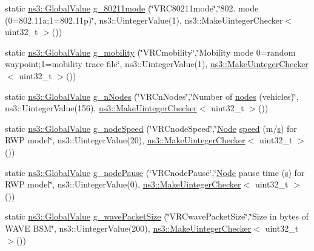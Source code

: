 \begin{DoxyCompactItemize}
\item 
static \hyperlink{classns3_1_1GlobalValue}{ns3\+::\+Global\+Value} \hyperlink{vanet-routing-compare_8cc_ac1a83af8a2f108bc9199027f9a12bde1}{g\+\_\+80211mode} (\char`\"{}V\+R\+C80211mode\char`\"{},\char`\"{}802. mode (0=802.\+11a;1=802.\+11p)\char`\"{}, ns3\+::\+Uinteger\+Value(1), ns3\+::\+Make\+Uinteger\+Checker$<$ uint32\+\_\+t $>$())
\item 
static \hyperlink{classns3_1_1GlobalValue}{ns3\+::\+Global\+Value} \hyperlink{vanet-routing-compare_8cc_a21858fbf533039d45630ff460f711898}{g\+\_\+mobility} (\char`\"{}V\+R\+Cmobility\char`\"{},\char`\"{}Mobility mode 0=random waypoint;1=mobility trace file\char`\"{}, ns3\+::\+Uinteger\+Value(1), \hyperlink{namespacens3_aed274764da411ed9397a3524a7c9abb8}{ns3\+::\+Make\+Uinteger\+Checker}$<$ uint32\+\_\+t $>$())
\item 
static \hyperlink{classns3_1_1GlobalValue}{ns3\+::\+Global\+Value} \hyperlink{vanet-routing-compare_8cc_a7432e7fa342e3ef6bb5db75753b31a3c}{g\+\_\+n\+Nodes} (\char`\"{}V\+R\+Cn\+Nodes\char`\"{},\char`\"{}Number of \hyperlink{visualizer-ideas_8txt_a3e1b3808014a2c68ab0cd0182e041be2}{nodes} (vehicles)\char`\"{}, ns3\+::\+Uinteger\+Value(156), \hyperlink{namespacens3_aed274764da411ed9397a3524a7c9abb8}{ns3\+::\+Make\+Uinteger\+Checker}$<$ uint32\+\_\+t $>$())
\item 
static \hyperlink{classns3_1_1GlobalValue}{ns3\+::\+Global\+Value} \hyperlink{vanet-routing-compare_8cc_ab053d14d08aa881e299f516862ab2dc1}{g\+\_\+node\+Speed} (\char`\"{}V\+R\+Cnode\+Speed\char`\"{},\char`\"{}\hyperlink{classns3_1_1Node}{Node} \hyperlink{mmwave-amc-test_8cc_a6dc6e6f3c75c509ce943163afb5dade7}{speed} (m/\hyperlink{generate__test__data__lte__sinr_8m_ad83eeb3a142285d1243a08c6b7026df8}{s}) for R\+WP model\char`\"{}, ns3\+::\+Uinteger\+Value(20), \hyperlink{namespacens3_aed274764da411ed9397a3524a7c9abb8}{ns3\+::\+Make\+Uinteger\+Checker}$<$ uint32\+\_\+t $>$())
\item 
static \hyperlink{classns3_1_1GlobalValue}{ns3\+::\+Global\+Value} \hyperlink{vanet-routing-compare_8cc_a44d88d3789417186134acfb624617e2f}{g\+\_\+node\+Pause} (\char`\"{}V\+R\+Cnode\+Pause\char`\"{},\char`\"{}\hyperlink{classns3_1_1Node}{Node} pause time (\hyperlink{generate__test__data__lte__sinr_8m_ad83eeb3a142285d1243a08c6b7026df8}{s}) for R\+WP model\char`\"{}, ns3\+::\+Uinteger\+Value(0), \hyperlink{namespacens3_aed274764da411ed9397a3524a7c9abb8}{ns3\+::\+Make\+Uinteger\+Checker}$<$ uint32\+\_\+t $>$())
\item 
static \hyperlink{classns3_1_1GlobalValue}{ns3\+::\+Global\+Value} \hyperlink{vanet-routing-compare_8cc_ac52879c1710daa8cb10df8883d2c7361}{g\+\_\+wave\+Packet\+Size} (\char`\"{}V\+R\+Cwave\+Packet\+Size\char`\"{},\char`\"{}Size in bytes of W\+A\+VE B\+SM\char`\"{}, ns3\+::\+Uinteger\+Value(200), \hyperlink{namespacens3_aed274764da411ed9397a3524a7c9abb8}{ns3\+::\+Make\+Uinteger\+Checker}$<$ uint32\+\_\+t $>$())

\end{DoxyCompactItemize}
